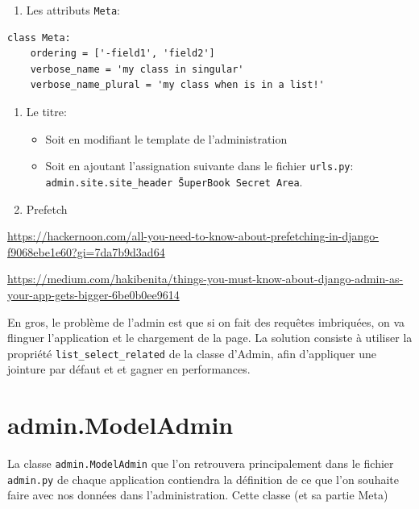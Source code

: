 \documentclass[11pt]{amsbook}
\begin{document}
\begin{enumerate}

\item{Les attributs \texttt{Meta}:}

\end{enumerate}


\begin{verbatim}
class Meta:
	ordering = ['-field1', 'field2']
	verbose_name = 'my class in singular'
	verbose_name_plural = 'my class when is in a list!'
\end{verbatim}

\begin{enumerate}

\item{Le titre:}

\begin{itemize}

\item Soit en modifiant le template de l’administration

\item Soit en ajoutant l’assignation suivante dans le fichier \texttt{urls.py}: \texttt{admin.site.site\_header \= \"SuperBook Secret Area}.

\end{itemize}

\item{Prefetch}

\end{enumerate}


\href{https://hackernoon.com/all-you-need-to-know-about-prefetching-in-django-f9068ebe1e60?gi=7da7b9d3ad64}{https://hackernoon.com/all-you-need-to-know-about-prefetching-in-django-f9068ebe1e60?gi=7da7b9d3ad64}


\href{https://medium.com/hakibenita/things-you-must-know-about-django-admin-as-your-app-gets-bigger-6be0b0ee9614}{https://medium.com/hakibenita/things-you-must-know-about-django-admin-as-your-app-gets-bigger-6be0b0ee9614}


En gros, le problème de l’admin est que si on fait des requêtes imbriquées, on va flinguer l’application et le chargement de la page.
La solution consiste à utiliser la propriété \texttt{list\_select\_related} de la classe d’Admin, afin d’appliquer une jointure par défaut et
et gagner en performances.


\hypertarget{x-admin.modeladmin}{\section{admin.ModelAdmin}}
La classe \texttt{admin.ModelAdmin} que l’on retrouvera principalement dans le fichier \texttt{admin.py} de chaque application contiendra la définition de ce que l’on souhaite faire avec nos données dans l’administration. Cette classe (et sa partie Meta)
\end{document}

